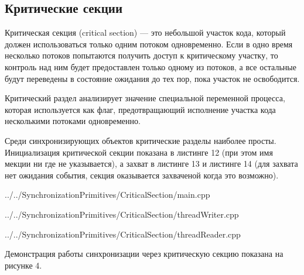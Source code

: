 \documentclass[a4paper, 12pt]{article}		%
\begin{document}

\newpage





\newpage
\subsection{Критические секции}

Критическая секция (critical section) — это небольшой участок кода, который должен использоваться только одним потоком одновременно. Если в одно время несколько потоков попытаются получить доступ к критическому участку, то контроль над ним будет предоставлен только одному из потоков, а все остальные будут переведены в состояние ожидания до тех пор, пока участок не освободится.

Критический раздел анализирует значение специальной переменной процесса, которая используется как флаг, предотвращающий исполнение участка кода несколькими потоками одновременно.

Среди синхронизирующих объектов критические разделы наиболее просты. Инициализация критической секции показана в листинге 12 (при этом имя мекции ни где не указывается), а захват в листинге 13 и листинге 14 (для захвата нет ожидания события, секция оказывается захваченой когда это возможно).


{../../SynchronizationPrimitives/CriticalSection/main.cpp}


{../../SynchronizationPrimitives/CriticalSection/threadWriter.cpp}

\newpage

{../../SynchronizationPrimitives/CriticalSection/threadReader.cpp}

Демонстрация работы синхронизации через критическую секцию показана на рисунке 4.
\end{document}
